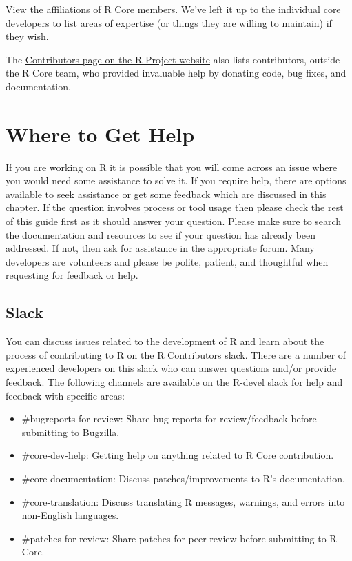 \documentclass[
]{book}
\begin{document}
View the \href{}{affiliations of R Core members}. We've left it up to the individual core developers to list areas of expertise (or things they are willing to maintain) if they wish.

The \href{https://www.r-project.org/contributors.html}{Contributors page on the R Project website} also lists contributors, outside the R Core team, who provided invaluable help by donating code, bug fixes, and documentation.

\chapter{Where to Get Help}\label{WhereToGetHelp}

If you are working on R it is possible that you will come across an issue where you would need some assistance to solve it. If you require help, there are options available to seek assistance or get some feedback which are discussed in this chapter. If the question involves process or tool usage then please check the rest of this guide first as it should answer your question. Please make sure to search the documentation and resources to see if your question has already been addressed. If not, then ask for assistance in the appropriate forum. Many developers are volunteers and please be polite, patient, and thoughtful when requesting for feedback or help.

\section{Slack}\label{slack}

You can discuss issues related to the development of R and learn about the process of contributing to R on the \href{https://r-contributors.slack.com/}{R Contributors slack}. There are a number of experienced developers on this slack who can answer questions and/or provide feedback. The following channels are available on the R-devel slack for help and feedback with specific areas:

\begin{itemize}
\item
  \#bugreports-for-review: Share bug reports for review/feedback before submitting to Bugzilla.
\item
  \#core-dev-help: Getting help on anything related to R Core contribution.
\item
  \#core-documentation: Discuss patches/improvements to R's documentation.
\item
  \#core-translation: Discuss translating R messages, warnings, and errors into non-English languages.
\item
  \#patches-for-review: Share patches for peer review before submitting to R Core.
\end{itemize}
\end{document}
